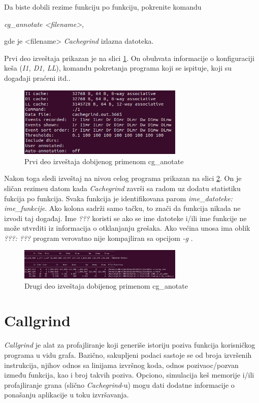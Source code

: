 \documentclass[12pt,oneside]{memoir}
\theoremstyle{plain}
\theoremstyle{definition}
\begin{document}
Da biste dobili rezime funkciju po funkciju, pokrenite komandu
\begin{center}
\textit{cg\_annotate <filename>},
\end{center}
gde je <filename> \textit{Cachegrind} izlazna datoteka.

Prvi deo izveštaja prikazan je na slici \ref{fig:slika2.16}. On obuhvata informacije o konfiguraciji keša (\textit{I1, D1, LL}), komandu pokretanja programa koji se ispituje, koji su događaji praćeni itd.. 
\begin{figure}[!ht]
  \centering
  \includegraphics[width=0.7\textwidth]{CgAnotateFirst.png}
  \caption{Prvi deo izveštaja dobijenog primenom cg\_anotate}
  \label{fig:slika2.16}
\end{figure}

Nakon toga sledi izveštaj na nivou celog programa prikazan na slici \ref{fig:slika2.17}. On je sličan rezimeu datom kada \textit{Cachegrind} završi sa radom uz dodatu statistiku fukcija po funkcija. Svaka funkcija je identifikovana parom \textit{ime\_datoteke: ime\_funkcije}. Ako kolona sadrži samo tačku, to znači da funkcija nikada ne izvodi taj događaj. Ime \textit{???} koristi se ako se ime datoteke i/ili ime funkcije ne može utvrditi iz informacija o otklanjanju grešaka. Ako većina unosa ima oblik \textit{???: ???} program verovatno nije kompajliran sa opcijom \textit{-g} \cite{Cachegrind}. 
\begin{figure}[!ht]
  \centering
  \includegraphics[width=0.7\textwidth]{CgAnotateSecond.png}
  \caption{Drugi deo izveštaja dobijenog primenom cg\_anotate}
  \label{fig:slika2.17}
\end{figure}

\section{Callgrind}
\textit{Callgrind} je alat za profajliranje koji generiše istoriju poziva funkcija korisničkog programa u vidu grafa. Bazično, sakupljeni podaci sastoje se od broja izvršenih instrukcija, njihov odnos sa linijama izvršnog koda, odnos pozivaoc/pozvan između funkcija, kao i broj takvih poziva. Opciono, simulacija keš memorije i/ili profajliranje grana (slično \textit{Cachegrind}-u) mogu dati dodatne informacije o ponašanju aplikacije u toku izvršavanja. 
\end{document}
